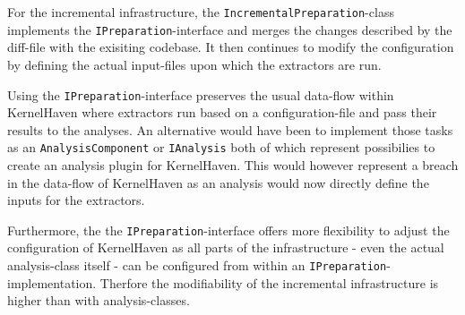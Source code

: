 \documentclass[a4paper]{article}
\begin{document}
For the incremental infrastructure, the \texttt{IncrementalPreparation}-class implements the \texttt{IPreparation}-interface and merges the changes described by the diff-file with the exisiting codebase. It then continues to  modify the configuration by defining the actual input-files upon which the extractors are run.

Using the \texttt{IPreparation}-interface preserves the usual data-flow within KernelHaven where extractors run based on a configuration-file and pass their results to the analyses. An alternative would have been to implement those tasks as an \texttt{AnalysisComponent} or \texttt{IAnalysis} both of which represent possibilies to create an analysis plugin for KernelHaven. This would however represent a breach in the data-flow of KernelHaven as an analysis would now directly define the inputs for the extractors.

Furthermore, the the \texttt{IPreparation}-interface offers more flexibility to adjust the configuration of KernelHaven as all parts of the infrastructure - even the actual analysis-class itself - can be configured from within an \texttt{IPreparation}-implementation. Therfore the modifiability of the incremental infrastructure is higher than with analysis-classes.



\newpage


\end{document}

